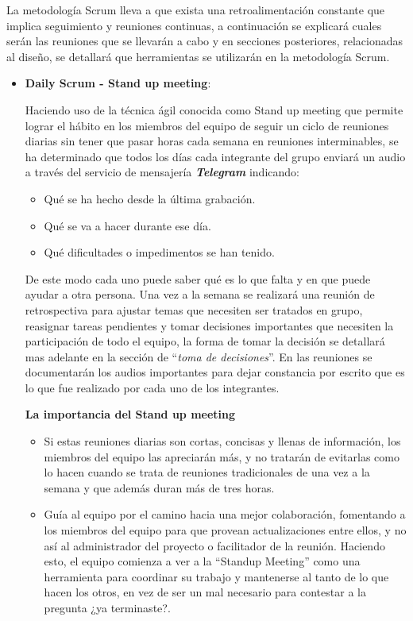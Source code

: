 La metodología Scrum lleva a que exista una retroalimentación constante que implica seguimiento y reuniones continuas, a continuación se explicará cuales serán las reuniones que se llevarán a cabo y en secciones posteriores, relacionadas al diseño, se detallará que herramientas se utilizarán en la metodología Scrum.
\begin{itemize}
	\item \textbf{Daily Scrum - Stand up meeting}:
    
    
    Haciendo uso de la técnica ágil conocida como Stand up meeting que permite  lograr el hábito en los miembros del equipo de seguir un ciclo de reuniones diarias sin tener que pasar horas cada semana en reuniones interminables, se ha determinado que  todos los días cada integrante del grupo enviará un audio a través del servicio de mensajería \textbf{\textit{Telegram}} indicando:
    \begin{itemize}
        \item Qué se ha hecho desde la última grabación.
        \item Qué se va a hacer durante ese día.
        \item Qué dificultades o impedimentos se han tenido.
    \end{itemize}
    De este modo cada uno puede saber qué es lo que falta y en que puede ayudar a otra persona. Una vez a la semana se realizará una reunión de retrospectiva para ajustar temas que necesiten ser tratados en grupo, reasignar tareas pendientes y tomar decisiones importantes que necesiten la participación de todo el equipo, la forma de tomar la decisión se detallará mas adelante en la sección de ``\textit{toma de decisiones}''. En las reuniones se documentarán los audios importantes para dejar constancia por escrito que es lo que fue realizado por cada uno de los integrantes.
    
    \textbf{La importancia del Stand up meeting}
    
    \begin{itemize}
		\item Si estas reuniones diarias son cortas, concisas y llenas de información, los miembros del equipo las apreciarán más, y no tratarán de evitarlas como lo hacen cuando se trata de reuniones tradicionales de una vez a la semana y que además duran más de tres horas.
        \item Guía al equipo por el camino hacia una mejor colaboración, fomentando a los miembros del equipo para que provean actualizaciones entre ellos, y no así al administrador del proyecto o facilitador de la reunión. Haciendo esto, el equipo comienza a ver a la “Standup Meeting” como una herramienta para coordinar su trabajo y mantenerse al tanto de lo que hacen los otros, en vez de ser un mal necesario para contestar a la pregunta ¿ya terminaste?.
	\end{itemize}
    

\end{itemize}
